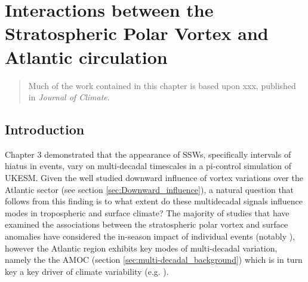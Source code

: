 \chapter{Interactions between the Stratospheric Polar Vortex and Atlantic circulation} 
\begin{quotation}
  Much of the work contained in this chapter is based upon xxx,
  published in \emph{Journal of Climate}.
\end{quotation}

\label{cha:surface}

\section{Introduction}
Chapter 3 demonstrated that the appearance of SSWs, specifically intervals of hiatus in events, vary on multi-decadal timescales in a pi-control simulation of UKESM. Given the well studied downward influence of vortex variations over the Atlantic sector (see section \ref{sec:Downward_influence}), a natural question that follows from this finding is to what extent do these multidecadal signals influence modes in tropospheric and surface climate? The majority of studies that have examined the associations between the stratospheric polar vortex and surface anomalies have considered the in-season impact of individual events (notably \cite{baldwinStratospheric2001a}), however the Atlantic region exhibits key modes of multi-decadal variation, namely the the AMOC (section \ref{sec:multi-decadal_background}) which is in turn key a key driver of climate variability (e.g. \cite{frankignoulInfluence2013b}). 


